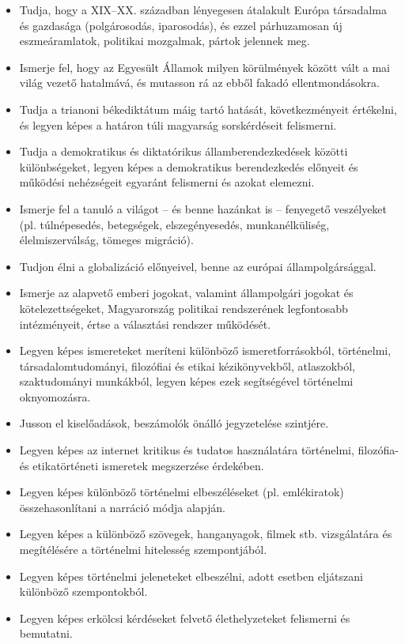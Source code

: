 \begin{itemize}
\item Tudja, hogy a XIX–XX. században lényegesen átalakult Európa társadalma és gazdasága (polgárosodás, iparosodás), és ezzel párhuzamosan új eszmeáramlatok, politikai mozgalmak, pártok jelennek meg.
\item Ismerje fel, hogy az Egyesült Államok milyen körülmények között vált a mai világ vezető hatalmává, és mutasson rá az ebből fakadó ellentmondásokra.
\item Tudja a trianoni békediktátum máig tartó hatását, következményeit értékelni, és legyen képes a határon túli magyarság sorskérdéseit felismerni.
\item Tudja a demokratikus és diktatórikus államberendezkedések közötti különbségeket, legyen képes a demokratikus berendezkedés előnyeit és működési nehézségeit egyaránt felismerni és azokat elemezni.
\item Ismerje fel a tanuló a világot – és benne hazánkat is – fenyegető veszélyeket (pl. túlnépesedés, betegségek, elszegényesedés, munkanélküliség, élelmiszerválság, tömeges migráció).
\item Tudjon élni a globalizáció előnyeivel, benne az európai állampolgársággal.
\item Ismerje az alapvető emberi jogokat, valamint állampolgári jogokat és kötelezettségeket, Magyarország politikai rendszerének legfontosabb intézményeit, értse a választási rendszer működését.
\item Legyen képes ismereteket meríteni különböző ismeretforrásokból, történelmi, társadalomtudományi, filozófiai és etikai kézikönyvekből, atlaszokból, szaktudományi munkákból, legyen képes ezek segítségével történelmi oknyomozásra.
\item Jusson el kiselőadások, beszámolók önálló jegyzetelése szintjére.
\item Legyen képes az internet kritikus és tudatos használatára történelmi, filozófia- és etikatörténeti ismeretek megszerzése érdekében.
\item Legyen képes különböző történelmi elbeszéléseket (pl. emlékiratok) összehasonlítani a narráció módja alapján.
\item Legyen képes a különböző szövegek, hanganyagok, filmek stb. vizsgálatára és megítélésére a történelmi hitelesség szempontjából.
\item Legyen képes történelmi jeleneteket elbeszélni, adott esetben eljátszani különböző szempontokból.
\item Legyen képes erkölcsi kérdéseket felvető élethelyzeteket felismerni és bemutatni.

\end{itemize}
